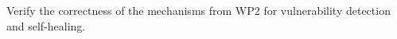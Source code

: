 \begin{Workpackage}{\thewpno}
\begin{WPObjectives}
\begin{compactitem}
 \item  Verify the correctness of the mechanisms from WP2 for vulnerability detection and self-healing.

\end{compactitem}

\end{WPObjectives}


\end{Workpackage}
